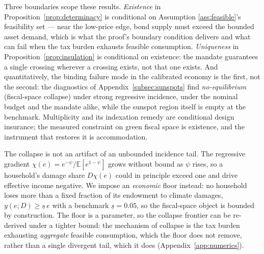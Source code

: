 \documentclass[12pt]{article}
\newcommand{\E}{\mathbb{E}}
\begin{document}
Three boundaries scope these results. \emph{Existence} in
Proposition~\ref{prop:determinacy} is conditional on Assumption
\ref{ass:feasible}'s feasibility set --- near the low-price edge, bond
supply must exceed the bounded asset demand, which is what the proof's
boundary condition delivers and what can fail when the tax burden exhausts
feasible consumption. \emph{Uniqueness} in
Proposition~\ref{prop:insulation} is conditional on existence: the mandate
guarantees a single crossing wherever a crossing exists, not that one
exists. And quantitatively, the binding failure mode in the calibrated
economy is the first, not the second: the diagnostics of
Appendix~\ref{subsec:sunspots} find \emph{no-equilibrium} (fiscal-space
collapse) under strong regressive incidence, under the nominal budget
and the mandate alike, while the sunspot region itself is empty at
the benchmark. Multiplicity and its indexation remedy are conditional
design insurance; the measured constraint on green fiscal space is
existence, and the instrument that restores it is accommodation.

The collapse is not an artifact of an unbounded incidence tail. The
regressive gradient $\chi(e)=e^{-\psi}/\E[e^{1-\psi}]$ grows without bound as
$\psi$ rises, so a household's damage share $D\chi(e)$ could in principle
exceed one and drive effective income negative. We impose an \emph{economic}
floor instead: no household loses more than a fixed fraction of its endowment
to climate damages, $y(e;D)\ge \underline{s}\,e$ with a benchmark
$\underline{s}=0.05$, so the fiscal-space object is bounded by construction.
The floor is a parameter, so the collapse frontier can be re-derived under
a tighter bound: the mechanism of collapse is the tax burden exhausting
\emph{aggregate} feasible consumption, which the floor does not remove, rather
than a single divergent tail, which it does (Appendix~\ref{app:numerics}).
\end{document}
